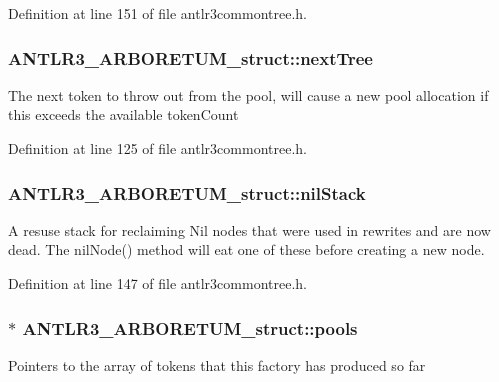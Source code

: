 Definition at line 151 of file antlr3commontree.\-h.

\hypertarget{struct_a_n_t_l_r3___a_r_b_o_r_e_t_u_m__struct_a3f359543cfbb1db3986c2c1873cd18f7}{
\subsubsection[{next\-Tree}]{ A\-N\-T\-L\-R3\-\_\-\-A\-R\-B\-O\-R\-E\-T\-U\-M\-\_\-struct\-::next\-Tree}}\label{struct_a_n_t_l_r3___a_r_b_o_r_e_t_u_m__struct_a3f359543cfbb1db3986c2c1873cd18f7}
The next token to throw out from the pool, will cause a new pool allocation if this exceeds the available token\-Count 

Definition at line 125 of file antlr3commontree.\-h.

\hypertarget{struct_a_n_t_l_r3___a_r_b_o_r_e_t_u_m__struct_ab63a7b88bbfa5444b51ac026680643c6}{
\subsubsection[{nil\-Stack}]{ A\-N\-T\-L\-R3\-\_\-\-A\-R\-B\-O\-R\-E\-T\-U\-M\-\_\-struct\-::nil\-Stack}}\label{struct_a_n_t_l_r3___a_r_b_o_r_e_t_u_m__struct_ab63a7b88bbfa5444b51ac026680643c6}
A resuse stack for reclaiming Nil nodes that were used in rewrites and are now dead. The nil\-Node() method will eat one of these before creating a new node. 

Definition at line 147 of file antlr3commontree.\-h.

\hypertarget{struct_a_n_t_l_r3___a_r_b_o_r_e_t_u_m__struct_af1ca4b92a269636ba1e16b3332e53fe1}{
\subsubsection[{pools}]{$\ast$ A\-N\-T\-L\-R3\-\_\-\-A\-R\-B\-O\-R\-E\-T\-U\-M\-\_\-struct\-::pools}}\label{struct_a_n_t_l_r3___a_r_b_o_r_e_t_u_m__struct_af1ca4b92a269636ba1e16b3332e53fe1}
Pointers to the array of tokens that this factory has produced so far 

